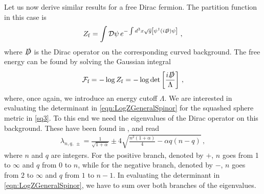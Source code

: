 \documentclass[12pt]{article}
\numberwithin{equation}{section}
\begin{document}
Let us now derive similar results for a free Dirac fermion.
The partition function in this case is 
%
\begin{align}
Z_{\rm f}=\int \mathcal{D} \psi\,  e^{-\int d^3x \sqrt{g} \left[\psi^{\dagger} (i \slashed{D} )\psi \right]} \ ,
\end{align}
%
where $\slashed{D}$ is the Dirac operator on the corresponding curved background. The free energy can be found by solving the Gaussian integral
%
\begin{align}
\mathcal{F}_{\textrm{f}} = - \log Z_{\rm f}=-\log \textrm{det}\left[ \frac{i \slashed{D}}{ \Lambda}\right] \, , \label{eqn:LogZGeneralSpinor}
\end{align}
%
where, once again, we introduce an energy cutoff $\Lambda$. We are interested in evaluating the determinant in \eqref{eqn:LogZGeneralSpinor} for the squashed sphere metric in \eqref{sq3}. To this end we need the eigenvalues of the Dirac operator on this background. These have been found in \cite{Dowker:1998pi, Gibbons198098, HITCHIN19741}, and read
%
\begin{align}\label{fermioneigen}
\lambda_{n,q,\,\pm} =   \frac{1}{\sqrt{1+\alpha}}  \pm 4\sqrt{ \frac{n^2(1+\alpha)}{4}-\alpha q (n - q) }  \, ,
\end{align}
%
where $n$ and $q$ are integers. For the positive branch, denoted by $+$, $n$ goes from 1 to $\infty$ and $q$ from 0 to $n$, while for the negative branch, denoted by $-$, $n$ goes from $2$ to $\infty$ and $q$ from $1$ to $n-1$. In evaluating the determinant in \eqref{eqn:LogZGeneralSpinor}, we have to sum over both branches of the eigenvalues.
\end{document}
